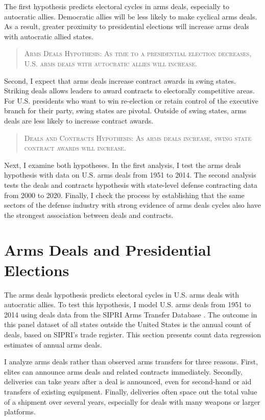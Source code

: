\documentclass[12pt]{article}
\begin{document}
The first hypothesis predicts electoral cycles in arms deals, especially to autocratic allies.
Democratic allies will be less likely to make cyclical arms deals. 
As a result, greater proximity to presidential elections will increase arms deals with autocratic allied states. 


\begin{quote}
\textsc{Arms Deals Hypothesis: As time to a presidential election decreases, U.S. arms deals with autocratic allies will increase.}
\end{quote}


Second, I expect that arms deals increase contract awards in swing states.
Striking deals allows leaders to award contracts to electorally competitive areas. 
For U.S. presidents who want to win re-election or retain control of the executive branch for their party, swing states are pivotal. 
Outside of swing states, arms deals are less likely to increase contract awards. 


\begin{quote}
\textsc{Deals and Contracts Hypothesis: As arms deals increase, swing state contract awards will increase.}
\end{quote}


Next, I examine both hypotheses. 
In the first analysis, I test the arms deals hypothesis with data on U.S. arms deals from 1951 to 2014.  
The second analysis tests the deals and contracts hypothesis with state-level defense contracting data from 2000 to 2020. 
Finally, I check the process by establishing that the same sectors of the defense industry with strong evidence of arms deals cycles also have the strongest association between deals and contracts. 


\section{Arms Deals and Presidential Elections}


The arms deals hypothesis predicts electoral cycles in U.S. arms deals with autocratic allies.
To test this hypothesis, I model U.S. arms deals from 1951 to 2014 using deals data from the SIPRI Arms Transfer Database \citep{SIPRI2021}.
The outcome in this panel dataset of all states outside the United States is the annual count of deals, based on SIPRI's trade register. 
This section presents count data regression estimates of annual arms deals. 


I analyze arms deals rather than observed arms transfers for three reasons.
First, elites can announce arms deals and related contracts immediately. 
Secondly, deliveries can take years after a deal is announced, even for second-hand or aid transfers of existing equipment. 
Finally, deliveries often space out the total value of a shipment over several years, especially for deals with many weapons or larger platforms. 
\end{document}
